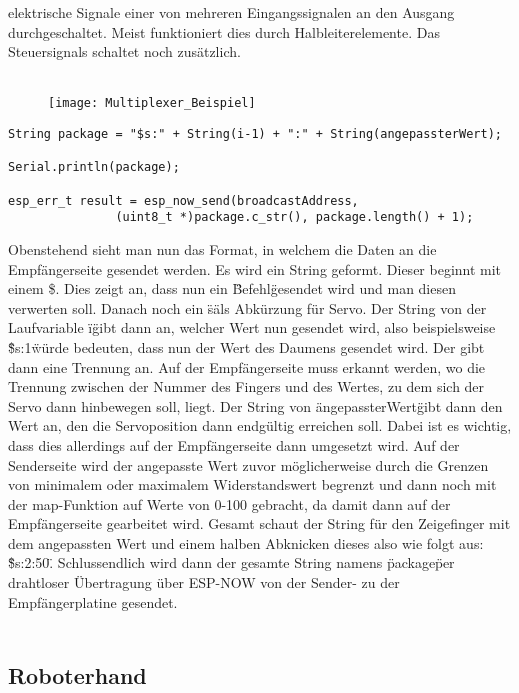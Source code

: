 \documentclass[titlepage,12pt,twoside]{article}
\begin{document}
elektrische Signale einer von mehreren Eingangssignalen an den Ausgang 
durchgeschaltet. Meist funktioniert dies durch Halbleiterelemente. Das Steuersignals
schaltet noch zusätzlich. \\
\\
\begin{figure}[H]
	\begin{center}
		\scalebox{1.2}
		{\texttt{[image: Multiplexer\_Beispiel]}}
	\end{center}
\end{figure}
\hfill \break
\begin{lstlisting}
String package = "$s:" + String(i-1) + ":" + String(angepassterWert);

Serial.println(package);

esp_err_t result = esp_now_send(broadcastAddress, 
        	   (uint8_t *)package.c_str(), package.length() + 1);
\end{lstlisting}
\hfill \break
Obenstehend sieht man nun das Format, in welchem die Daten an die Empfängerseite 
gesendet werden. Es wird ein String geformt. Dieser beginnt mit einem \$. Dies zeigt 
an, dass nun ein \"Befehl\" gesendet wird und man diesen verwerten soll. Danach noch 
ein \"s\" als Abkürzung für Servo. Der String von der Laufvariable \"i\" gibt dann an, 
welcher Wert nun gesendet wird, also beispielsweise \"\$s:1\" würde bedeuten, dass nun 
der Wert des Daumens gesendet wird. Der gibt dann eine Trennung an. Auf der 
Empfängerseite muss erkannt werden, wo die Trennung zwischen der Nummer des Fingers 
und des Wertes, zu dem sich der Servo dann hinbewegen soll, liegt. Der String von 
\"angepassterWert\" gibt dann den Wert an, den die Servoposition dann endgültig 
erreichen soll. Dabei ist es wichtig, dass dies allerdings auf der Empfängerseite 
dann umgesetzt wird. Auf der Senderseite wird der angepasste Wert zuvor 
möglicherweise durch die Grenzen von minimalem oder maximalem Widerstandswert 
begrenzt und dann noch mit der map-Funktion auf Werte von 0-100 gebracht, da damit 
dann auf der Empfängerseite gearbeitet wird. Gesamt schaut der String für den 
Zeigefinger mit dem angepassten Wert und einem halben Abknicken dieses also wie 
folgt aus: \"\$s:2:50\". Schlussendlich wird dann der gesamte String namens 
\"package\" per drahtloser Übertragung über ESP-NOW von der Sender- zu der 
Empfängerplatine gesendet. \\
\\


\subsection{Roboterhand}
\end{document}
